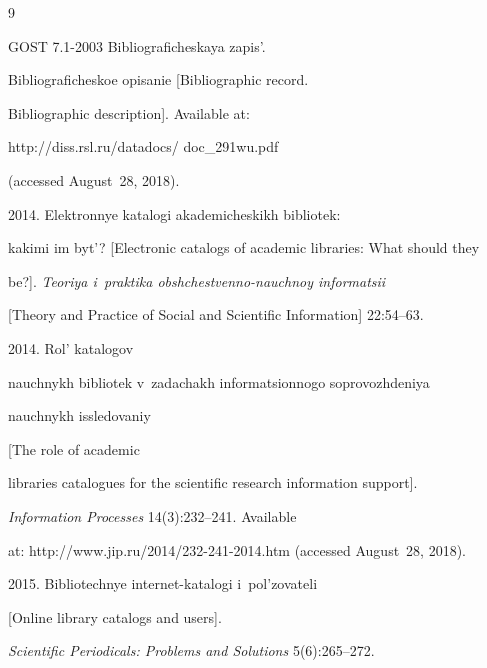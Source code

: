 {\small\frenchspacing


{%




\begin{thebibliography}{9}




GOST 7.1-2003 Bibliograficheskaya zapis'. 


Bibliograficheskoe opisanie [Bibliographic record. 


Bibliographic description]. Available at: {\sf 


http://diss.rsl.ru/datadocs/ doc\_291wu.pdf} (accessed August~28, 2018).




 2014. Elektronnye katalogi akademicheskikh bibliotek: 


kakimi im byt'? [Electronic catalogs of academic libraries: What should they 


be?]. \textit{Teoriya i~praktika obshchestvenno-nauchnoy informatsii}


[Theory and Practice of Social and Scientific Information] 22:54--63.




 2014. Rol' katalogov


nauchnykh bibliotek v~za\-da\-chakh informatsionnogo soprovozhdeniya


nauchnykh issledovaniy


[The role of academic 


libraries catalogues for the scientific research information support]. 


\textit{Information Processes} 14(3):232--241. Available 


at: {\sf http://www.jip.ru/2014/232-241-2014.htm}  (accessed August~28, 2018).




 2015. Bibliotechnye internet-katalogi i~pol'zovateli


[Online library catalogs and users]. 


\textit{Scientific Periodicals: Problems and Solutions} 5(6):265--272.


\end{thebibliography}


} }








